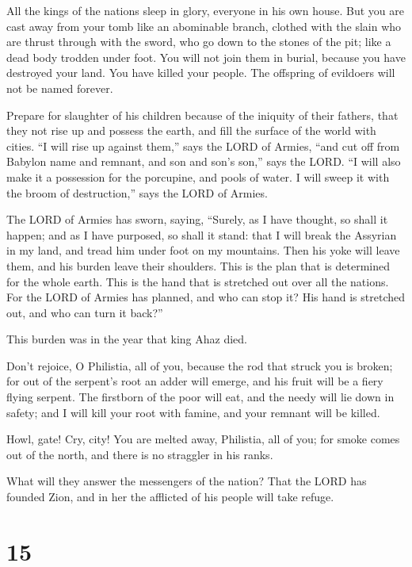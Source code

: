  All the kings of the nations sleep in glory, everyone in
his own house.  But you are cast away from your tomb like
an abominable branch, clothed with the slain who are thrust through with
the sword, who go down to the stones of the pit; like a dead body
trodden under foot.  You will not join them in burial,
because you have destroyed your land. You have killed your people. The
offspring of evildoers will not be named forever.

 Prepare for slaughter of his children because of the
iniquity of their fathers, that they not rise up and possess the earth,
and fill the surface of the world with cities.  ``I will
rise up against them,'' says the LORD of Armies, ``and cut off from
Babylon name and remnant, and son and son's son,'' says the LORD.
 ``I will also make it a possession for the porcupine,
and pools of water. I will sweep it with the broom of destruction,''
says the LORD of Armies.

 The LORD of Armies has sworn, saying, ``Surely, as I
have thought, so shall it happen; and as I have purposed, so shall it
stand:  that I will break the Assyrian in my land, and
tread him under foot on my mountains. Then his yoke will leave them, and
his burden leave their shoulders.  This is the plan that
is determined for the whole earth. This is the hand that is stretched
out over all the nations.  For the LORD of Armies has
planned, and who can stop it? His hand is stretched out, and who can
turn it back?''

 This burden was in the year that king Ahaz died.

 Don't rejoice, O Philistia, all of you, because the rod
that struck you is broken; for out of the serpent's root an adder will
emerge, and his fruit will be a fiery flying serpent. 
The firstborn of the poor will eat, and the needy will lie down in
safety; and I will kill your root with famine, and your remnant will be
killed.

 Howl, gate! Cry, city! You are melted away, Philistia,
all of you; for smoke comes out of the north, and there is no straggler
in his ranks.

 What will they answer the messengers of the nation? That
the LORD has founded Zion, and in her the afflicted of his people will
take refuge.

\hypertarget{section-14}{%
\section{15}\label{section-14}}

